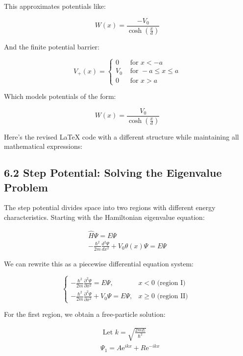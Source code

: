 \documentclass[10pt]{article}
\begin{document}
This approximates potentials like:

\begin{equation*}
W(x)=\frac{-V_{0}}{\cosh \left(\frac{x}{d}\right)} \tag{6.5}
\end{equation*}

And the finite potential barrier:

\[
V_{+}(x)= \begin{cases}0 & \text { for } x<-a  \tag{6.6}\\ V_{0} & \text { for }-a \leq x \leq a \\ 0 & \text { for } x>a\end{cases}
\]

Which models potentials of the form:

\begin{equation*}
W(x)=\frac{V_{0}}{\cosh \left(\frac{x}{d}\right)} \tag{6.7}
\end{equation*}

Here's the revised LaTeX code with a different structure while maintaining all mathematical expressions:


\subsection*{6.2 Step Potential: Solving the Eigenvalue Problem}

The step potential divides space into two regions with different energy characteristics. Starting with the Hamiltonian eigenvalue equation:

\begin{gather*}
\hat{H} \Psi=E \Psi  \tag{6.8}\\
-\frac{\hbar^{2}}{2 m} \frac{d^{2} \Psi}{d x^{2}}+V_{0} \theta(x) \Psi=E \Psi \tag{6.9}
\end{gather*}

We can rewrite this as a piecewise differential equation system:

\[
\begin{cases}-\frac{\hbar^{2}}{2 m} \frac{\partial^{2} \Psi}{\partial x^{2}}=E \Psi, & x<0 \text { (region I) }  \tag{6.10}\\ -\frac{\hbar^{2}}{2 m} \frac{\partial^{2} \Psi}{\partial x^{2}}+V_{0} \Psi=E \Psi, & x \geq 0 \text { (region II) }\end{cases}
\]

For the first region, we obtain a free-particle solution:

\begin{align*}
& \text { Let } k=\sqrt{\frac{2 m E}{\hbar^{2}}}  \tag{6.11}\\
& \Psi_{1}=A \mathrm{e}^{i k x}+R \mathrm{e}^{-i k x}
\end{align*}
\end{document}
